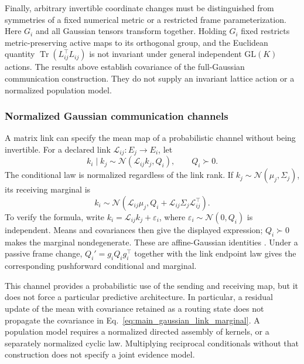 \documentclass[twoside,11pt]{article}
\begin{document}
Finally, arbitrary invertible coordinate changes must be distinguished from symmetries of a fixed numerical metric or a restricted frame parameterization. Here $G_i$ and all Gaussian tensors transform together. Holding $G_i$ fixed restricts metric-preserving active maps to its orthogonal group, and the Euclidean quantity $\operatorname{Tr}(L_{ij}^\top L_{ij})$ is not invariant under general independent $\mathrm{GL}(K)$ actions. The results above establish covariance of the full-Gaussian communication construction. They do not supply an invariant lattice action or a normalized population model.

\subsubsection{Normalized Gaussian communication channels}
\label{sec:gaussian_link_channels}

A matrix link can specify the mean map of a probabilistic channel without being invertible. For a declared link \(\mathcal L_{ij}:E_j\to E_i\), let
\begin{equation}
k_i\mid k_j\sim\mathcal N(\mathcal L_{ij}k_j,Q_i),
\qquad Q_i\succ0.
\label{eq:main_gaussian_link_kernel}
\end{equation}
The conditional law is normalized regardless of the link rank. If \(k_j\sim\mathcal N(\mu_j,\Sigma_j)\), its receiving marginal is
\begin{equation}
k_i\sim\mathcal N\left(
\mathcal L_{ij}\mu_j,
Q_i+\mathcal L_{ij}\Sigma_j\mathcal L_{ij}^{\top}\right).
\label{eq:main_gaussian_link_marginal}
\end{equation}
To verify the formula, write \(k_i=\mathcal L_{ij}k_j+\varepsilon_i\), where \(\varepsilon_i\sim\mathcal N(0,Q_i)\) is independent. Means and covariances then give the displayed expression; \(Q_i\succ0\) makes the marginal nondegenerate. These are affine-Gaussian identities \citep{Bishop2006}. Under a passive frame change, \(Q_i'=g_iQ_ig_i^\top\) together with the link endpoint law gives the corresponding pushforward conditional and marginal.

This channel provides a probabilistic use of the sending and receiving map, but it does not force a particular predictive architecture. In particular, a residual update of the mean with covariance retained as a routing state does not propagate the covariance in Eq.~\eqref{eq:main_gaussian_link_marginal}. A population model requires a normalized directed assembly of kernels, or a separately normalized cyclic law. Multiplying reciprocal conditionals without that construction does not specify a joint evidence model.
\end{document}
